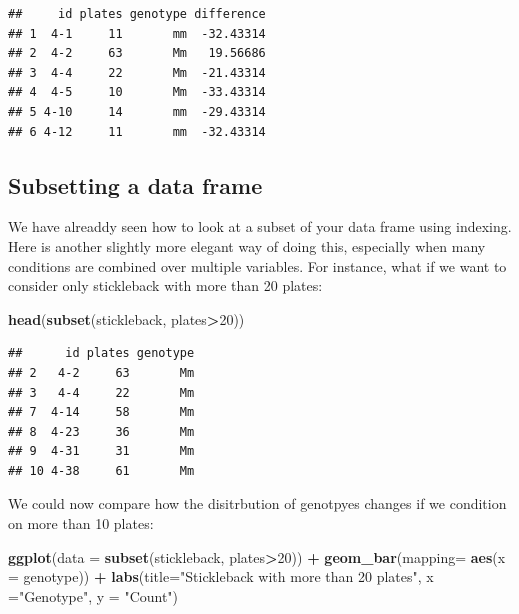 \documentclass[]{article}
\newenvironment{Shaded}{\begin{snugshade}}{\end{snugshade}}
\newcommand{\DataTypeTok}[1]{\textcolor[rgb]{0.13,0.29,0.53}{#1}}
\newcommand{\DecValTok}[1]{\textcolor[rgb]{0.00,0.00,0.81}{#1}}
\newcommand{\KeywordTok}[1]{\textcolor[rgb]{0.13,0.29,0.53}{\textbf{#1}}}
\newcommand{\NormalTok}[1]{#1}
\newcommand{\OperatorTok}[1]{\textcolor[rgb]{0.81,0.36,0.00}{\textbf{#1}}}
\newcommand{\StringTok}[1]{\textcolor[rgb]{0.31,0.60,0.02}{#1}}
\begin{document}
\begin{verbatim}
##     id plates genotype difference
## 1  4-1     11       mm  -32.43314
## 2  4-2     63       Mm   19.56686
## 3  4-4     22       Mm  -21.43314
## 4  4-5     10       Mm  -33.43314
## 5 4-10     14       mm  -29.43314
## 6 4-12     11       mm  -32.43314
\end{verbatim}

\hypertarget{subsetting-a-data-frame}{%
\subsection{Subsetting a data frame}\label{subsetting-a-data-frame}}

We have alreaddy seen how to look at a subset of your data frame using
indexing. Here is another slightly more elegant way of doing this,
especially when many conditions are combined over multiple variables.
For instance, what if we want to consider only stickleback with more
than 20 plates:

\begin{Shaded}
\begin{Highlighting}[]
\KeywordTok{head}\NormalTok{(}\KeywordTok{subset}\NormalTok{(stickleback, plates}\OperatorTok{>}\DecValTok{20}\NormalTok{))}
\end{Highlighting}
\end{Shaded}

\begin{verbatim}
##      id plates genotype
## 2   4-2     63       Mm
## 3   4-4     22       Mm
## 7  4-14     58       Mm
## 8  4-23     36       Mm
## 9  4-31     31       Mm
## 10 4-38     61       Mm
\end{verbatim}

We could now compare how the disitrbution of genotpyes changes if we
condition on more than 10 plates:

\begin{Shaded}
\begin{Highlighting}[]
\KeywordTok{ggplot}\NormalTok{(}\DataTypeTok{data =} \KeywordTok{subset}\NormalTok{(stickleback, plates}\OperatorTok{>}\DecValTok{20}\NormalTok{)) }\OperatorTok{+}\StringTok{ }
\StringTok{  }\KeywordTok{geom_bar}\NormalTok{(}\DataTypeTok{mapping=} \KeywordTok{aes}\NormalTok{(}\DataTypeTok{x =}\NormalTok{ genotype)) }\OperatorTok{+}
\StringTok{  }\KeywordTok{labs}\NormalTok{(}\DataTypeTok{title=}\StringTok{"Stickleback with more than 20 plates"}\NormalTok{,}
        \DataTypeTok{x =}\StringTok{"Genotype"}\NormalTok{, }\DataTypeTok{y =} \StringTok{"Count"}\NormalTok{)}
\end{Highlighting}
\end{Shaded}
\end{document}
